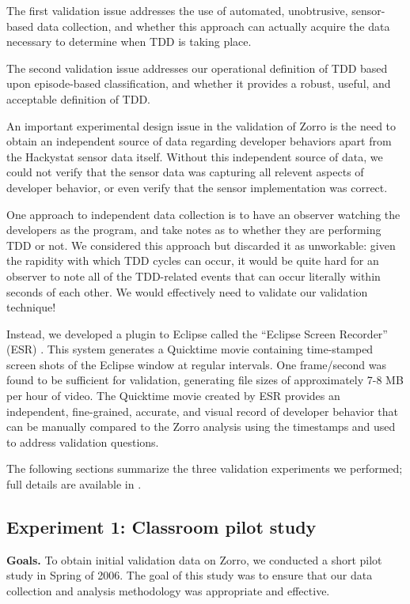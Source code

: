 \documentclass[smallextended]{svjour3}     %
\begin{document}
The first validation issue addresses the use of automated, unobtrusive,
sensor-based data collection, and whether this approach can actually
acquire the data necessary to determine when TDD is taking place.

The second validation issue addresses our operational definition of TDD
based upon episode-based classification, and whether it provides a robust,
useful, and acceptable definition of TDD.

An important experimental design issue in the validation of Zorro is the
need to obtain an independent source of data regarding developer behaviors
apart from the Hackystat sensor data itself.  Without this independent
source of data, we could not verify that the sensor data was capturing
all relevent aspects of developer behavior, or even verify that the sensor
implementation was correct.

One approach to independent data collection is to have an observer
watching the developers as the program, and take notes as to whether they
are performing TDD or not.  We considered this approach but discarded it as
unworkable: given the rapidity with which TDD cycles can occur, it would be
quite hard for an observer to note all of the TDD-related events that can
occur literally within seconds of each other. We would effectively need to
validate our validation technique!

Instead, we developed a plugin to Eclipse called the ``Eclipse Screen
Recorder'' (ESR) \cite{esr}.  This system generates a Quicktime movie
containing time-stamped screen shots of the Eclipse window at regular
intervals. One frame/second was found to be sufficient for validation,
generating file sizes of approximately 7-8 MB per hour of video.  The
Quicktime movie created by ESR provides an independent, fine-grained,
accurate, and visual record of developer behavior that can be manually
compared to the Zorro analysis using the timestamps and used to address
validation questions.

The following sections summarize the three validation experiments we performed;
full details are available in \cite{csdl2-07-04}.

\subsection{Experiment 1: Classroom pilot study}

{\bf Goals.}  To obtain initial validation data on Zorro, we conducted a
short pilot study in Spring of 2006. The goal of this study was to ensure
that our data collection and analysis methodology was appropriate and
effective.
\end{document}
